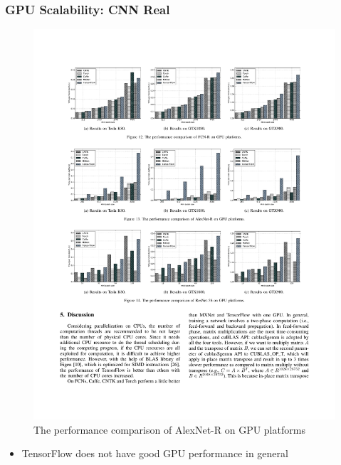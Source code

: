 \begin{frame}
	\MyLogo
	\frametitle{GPU Scalability: CNN Real}

	\begin{figure}[htbp] 
		\includegraphics[width=\linewidth]{figures/AlexNet-R2.pdf} 
		\caption{The performance comparison of AlexNet-R on GPU platforms}
	\end{figure}

\vskip -10pt
\begin{mdframed}[style=mystyle1]
\begin{itemize}
\item TensorFlow does not have good GPU performance in general
\end{itemize}
\end{mdframed}

\end{frame}


